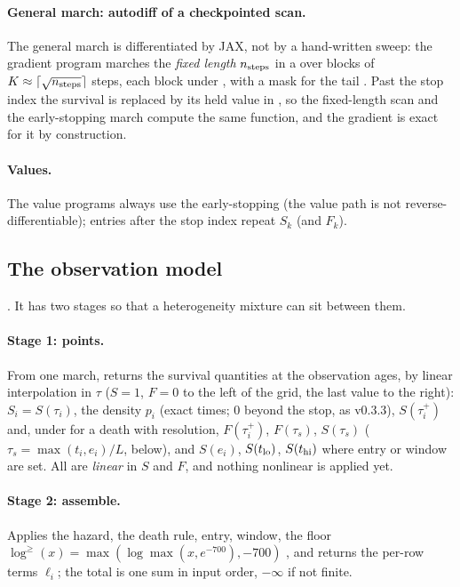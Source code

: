 \paragraph{General march: autodiff of a checkpointed scan.} The general march is differentiated by JAX, not by a
hand-written sweep: the gradient program marches the \emph{fixed length} $n_{\rm steps}$ in a  over
blocks of $K\approx\lceil\sqrt{n_{\rm steps}}\rceil$ steps, each block under , with a
 mask for the tail . Past the stop index the
survival is replaced by its held value in , so the fixed-length scan and the early-stopping
march compute the same function, and the gradient is exact for it by construction.

\paragraph{Values.} The value programs always use the early-stopping  (the value path is not
reverse-differentiable); entries after the stop index repeat $S_k$ (and $F_k$).

\subsection{The observation model}\label{sec:fp-obs}

. It has two stages so that a heterogeneity mixture can sit between them.

\paragraph{Stage 1: points.} From one march,  returns the survival quantities at the observation
ages, by linear interpolation in $\tau$ ($S=1$, $F=0$ to the left of the grid, the last value to the right):
$S_i=S(\tau_i)$, the density $p_i$ (exact times; $0$ beyond the stop, as v0.3.3), $S(\tau_i^+)$ and, under 
for a death with resolution, $F(\tau_i^+)$, $F(\tau_s)$, $S(\tau_s)$ ($\tau_s=\max(t_i,e_i)/L$, below), and
$S(e_i)$, $S(t_{\rm lo})$, $S(t_{\rm hi})$ where entry or window are set. All are \emph{linear} in $S$ and $F$, and
nothing nonlinear is applied yet.

\paragraph{Stage 2: assemble.} Applies the hazard, the death rule, entry, window, the floor
$\log^{\ge}(x)=\max(\log\max(x,e^{-700}),-700)$ , and returns the per-row
terms $\ell_i$; the total is one sum in input order, $-\infty$ if not finite.

